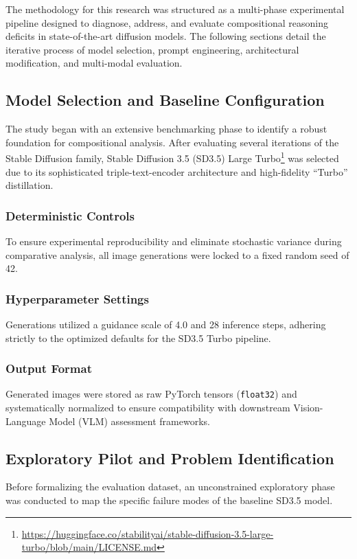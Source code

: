 The methodology for this research was structured as a multi-phase experimental pipeline designed to diagnose, address, and evaluate compositional reasoning deficits in state-of-the-art diffusion models. The following sections detail the iterative process of model selection, prompt engineering, architectural modification, and multi-modal evaluation.

\subsection{Model Selection and Baseline Configuration}
The study began with an extensive benchmarking phase to identify a robust foundation for compositional analysis. After evaluating several iterations of the Stable Diffusion family, Stable Diffusion 3.5 (SD3.5) Large Turbo\footnote{\url{https://huggingface.co/stabilityai/stable-diffusion-3.5-large-turbo/blob/main/LICENSE.md}} was selected due to its sophisticated triple-text-encoder architecture and high-fidelity ``Turbo'' distillation.

\subsubsection{Deterministic Controls}
To ensure experimental reproducibility and eliminate stochastic variance during comparative analysis, all image generations were locked to a fixed random seed of 42.

\subsubsection{Hyperparameter Settings}
Generations utilized a guidance scale \citep{zhan2026understanding} of 4.0 and 28 inference steps, adhering strictly to the optimized defaults for the SD3.5 Turbo pipeline.

\subsubsection{Output Format}
Generated images were stored as raw PyTorch tensors (\texttt{float32}) and systematically normalized to ensure compatibility with downstream Vision-Language Model (VLM) assessment frameworks.

\subsection{Exploratory Pilot and Problem Identification}
Before formalizing the evaluation dataset, an unconstrained exploratory phase was conducted to map the specific failure modes of the baseline SD3.5 model.

